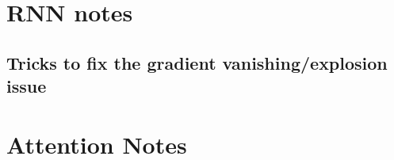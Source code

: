 \documentclass[11pt]{article}
\begin{document}
\clearpage

\appendix

\section{RNN notes}

\subsection{Tricks to fix the gradient vanishing/explosion issue}\label{app:tricks-gradient-v/e}

\begin{figure}[H]
    \centering
\end{figure}

\section{Attention Notes}
\end{document}
